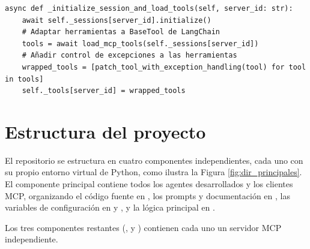 \begin{lstlisting}[caption={\protect\opus{mcp_multi_client.py}: función \protect\opus{_initialize_session_and_load_tools} en el cliente MCP},label={lst:mcpinit}]
  async def _initialize_session_and_load_tools(self, server_id: str):
    await self._sessions[server_id].initialize()
    # Adaptar herramientas a BaseTool de LangChain
    tools = await load_mcp_tools(self._sessions[server_id])
    # Añadir control de excepciones a las herramientas
    wrapped_tools = [patch_tool_with_exception_handling(tool) for tool in tools]
    self._tools[server_id] = wrapped_tools
\end{lstlisting}

\section{Estructura del proyecto}
El repositorio se estructura en cuatro componentes independientes, cada uno con su propio entorno virtual de Python, como ilustra la Figura \ref{fig:dir_principales}. El componente principal  contiene todos los agentes desarrollados y los clientes MCP, organizando el código fuente en , los prompts y documentación en , las variables de configuración en  y , y la lógica principal en .

Los tres componentes restantes (,  y ) contienen cada uno un servidor MCP independiente.

